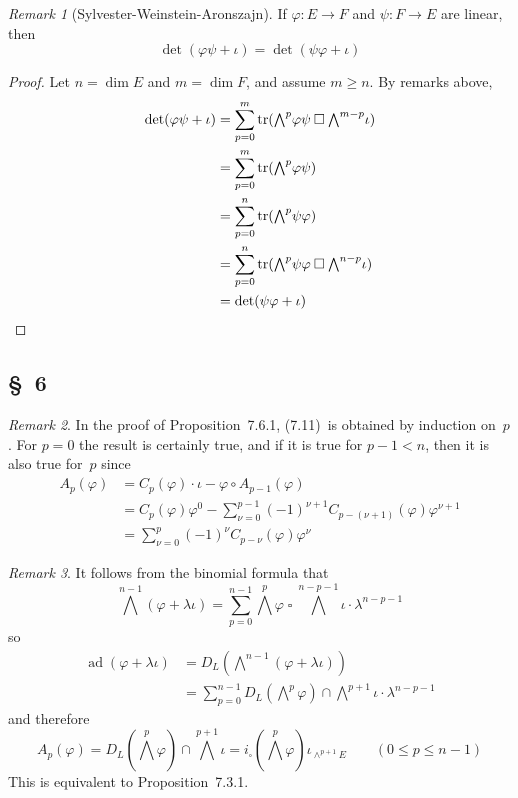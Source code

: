 \documentclass[letterpaper,12pt]{article}
\DeclareMathOperator{\ad}{ad}
\DeclareMathOperator{\tr}{tr}
\newcommand{\sect}{\cap}
\newcommand{\after}{\circ}
\newcommand{\mult}{\cdot}
\newcommand{\eprod}{\wedge}
\newcommand{\bigeprod}{\bigwedge}
\newcommand{\medeprod}{{\textstyle\bigeprod}}
\newcommand{\bprod}{\mathbin{\square}}
\theoremstyle{definition}
\theoremstyle{remark}
\newtheorem*{rmk}{Remark}
\begin{document}
\begin{rmk}[Sylvester-Weinstein-Aronszajn]
If \(\varphi:E\to F\) and \(\psi:F\to E\) are linear, then
\[\det(\varphi\psi+\iota)=\det(\psi\varphi+\iota)\]
\end{rmk}
\begin{proof}
Let \(n=\dim E\) and \(m=\dim F\), and assume \(m\ge n\). By remarks above,
\begin{align*}
\det(\varphi\psi+\iota)&=\sum_{p=0}^m\tr(\medeprod^p\varphi\psi\bprod\medeprod^{m-p}\iota)\\
	&=\sum_{p=0}^m\tr(\medeprod^p\varphi\psi)\\
	&=\sum_{p=0}^n\tr(\medeprod^p\psi\varphi)\\
	&=\sum_{p=0}^n\tr(\medeprod^p\psi\varphi\bprod\medeprod^{n-p}\iota)\\
	&=\det(\psi\varphi+\iota)\qedhere
\end{align*}
\end{proof}

\subsection*{\S~6}
\begin{rmk}
In the proof of Proposition~7.6.1, (7.11)~is obtained by induction on~\(p\). For \(p=0\) the result is certainly true, and if it is true for \(p-1<n\), then it is also true for~\(p\) since
\begin{align*}
A_p(\varphi)&=C_p(\varphi)\mult\iota-\varphi\after A_{p-1}(\varphi)\\
	&=C_p(\varphi)\varphi^0-\sum_{\nu=0}^{p-1}(-1)^{\nu+1}C_{p-(\nu+1)}(\varphi)\varphi^{\nu+1}\\
	&=\sum_{\nu=0}^p(-1)^{\nu}C_{p-\nu}(\varphi)\varphi^{\nu}
\end{align*}
\end{rmk}

\begin{rmk}
It follows from the binomial formula that
\[\medeprod^{n-1}(\varphi+\lambda\iota)=\sum_{p=0}^{n-1}\medeprod^p\varphi\bprod\medeprod^{n-p-1}\iota\mult\lambda^{n-p-1}\]
so
\begin{align*}
\ad(\varphi+\lambda\iota)&=D_L(\medeprod^{n-1}(\varphi+\lambda\iota))\\
	&=\sum_{p=0}^{n-1}D_L(\medeprod^p\varphi)\sect\medeprod^{p+1}\iota\mult\lambda^{n-p-1}
\end{align*}
and therefore
\[A_p(\varphi)=D_L(\medeprod^p\varphi)\sect\medeprod^{p+1}\iota=i_{\bprod}(\medeprod^p\varphi)\iota_{\eprod^{p+1}E}\qquad(0\le p\le n-1)\]
This is equivalent to Proposition~7.3.1.
\end{rmk}
\end{document}

